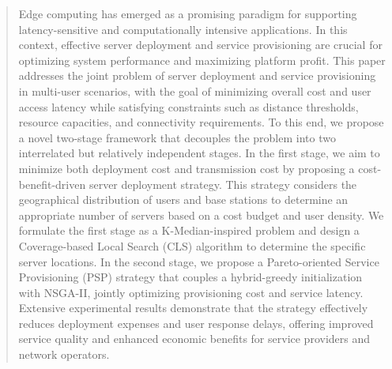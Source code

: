 \documentclass[10pt, conference, letterpaper]{IEEEtran}
\begin{document}
\begin{abstract}
Edge computing has emerged as a promising paradigm for supporting latency-sensitive and computationally intensive applications. In this context, effective server deployment and service provisioning are crucial for optimizing system performance and maximizing platform profit. This paper addresses the joint problem of server deployment and service provisioning in multi-user scenarios, with the goal of minimizing overall cost and user access latency while satisfying constraints such as distance thresholds, resource capacities, and connectivity requirements. To this end, we propose a novel two-stage framework that decouples the problem into two interrelated but relatively independent stages. In the first stage, we aim to minimize both deployment cost and transmission cost by proposing a cost-benefit-driven server deployment strategy. This strategy considers the geographical distribution of users and base stations to determine an appropriate number of servers based on a cost budget and user density. We formulate the first stage as a K-Median-inspired problem and design a Coverage-based Local Search (CLS) algorithm to determine the specific server locations. In the second stage, we propose a Pareto-oriented Service Provisioning (PSP) strategy that couples a hybrid-greedy initialization with NSGA-II, jointly optimizing provisioning cost and service latency. Extensive experimental results demonstrate that the strategy effectively reduces deployment expenses and user response delays, offering improved service quality and enhanced economic benefits for service providers and network operators.
\end{abstract}
\end{document}
